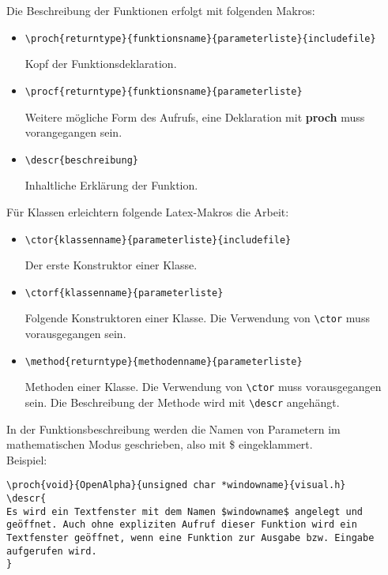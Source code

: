 \documentclass[10pt,titlepage]{article}
\newcounter{referencecounter}
\newcommand{\includefile}{INCLUDEFILE}
\newcommand{\classname}{}
\newcommand\cb[1]{\textless{}#1\textgreater}
\newcommand{\nextlabel}[3]{
  \stepcounter{referencecounter}
  \glossary{#1;#2;#3;\arabic{referencecounter}}
  \hypertarget{reflabel\arabic{referencecounter}}{}
}
\newcommand{\proc}[3]{
  \vspace*{0.5cm}
  \par\noindent#1 \hypertarget{#2}{{\bf #2}}{\small (#3)}\hspace{0.5cm} \includefile 
  \nextlabel{#1}{#2}{#3} \\
}
\newcommand{\proch}[4]{
    \renewcommand{\includefile}{\hspace*{\fill} ({\it \#include~\cb{#4}})}
  \vspace*{0.5cm}
  \par\noindent#1 \hypertarget{#2}{{\bf #2}}{\small (#3)} \includefile 
  \nextlabel{#1}{#2}{#3} \\
}
\newcommand{\procf}[3]{
  #1 \hypertarget{#2}{{\bf #2}}{\small (#3)}
  \nextlabel{#1}{#2}{#3} \\
}
\newcommand{\ctor}[4][]{
\renewcommand{\classname}{#2}
\proch{#1}{#2::#2}{#3}{#4}
}
\newcommand{\ctorf}[2]{
\renewcommand{\classname}{#1}
\procf{}{#1::#1}{#2}
}
\newcommand{\method}[3]{
\proc{#1}{\classname::#2}{#3}
}
\newcommand{\descr}[1]{\nopagebreak
  \vspace*{-0.6cm}
  \begin{quote}
        #1
  \end{quote}
}
\begin{document}
{{Die Beschreibung der Funktionen erfolgt mit folgenden Makros:
\begin{itemize}
\item
\begin{verbatim}
\proch{returntype}{funktionsname}{parameterliste}{includefile}
\end{verbatim}
Kopf der Funktionsdeklaration.
\item
\begin{verbatim}
\procf{returntype}{funktionsname}{parameterliste}
\end{verbatim}
Weitere mögliche Form des Aufrufs, eine Deklaration mit {\bf proch} muss
vorangegangen sein.
\item
\begin{verbatim}
\descr{beschreibung}
\end{verbatim}
Inhaltliche Erklärung der Funktion.
\end{itemize}

Für Klassen erleichtern folgende Latex-Makros die Arbeit:
\begin{itemize}
\item
\begin{verbatim}
\ctor{klassenname}{parameterliste}{includefile}
\end{verbatim}
Der erste Konstruktor einer Klasse.
\item
\begin{verbatim}
\ctorf{klassenname}{parameterliste}
\end{verbatim}
Folgende Konstruktoren einer Klasse. Die Verwendung von \verb+\ctor+ muss
vorausgegangen sein.
\item
\begin{verbatim}
\method{returntype}{methodenname}{parameterliste}
\end{verbatim}
Methoden einer Klasse. Die Verwendung von \verb+\ctor+ muss vorausgegangen 
sein. Die Beschreibung der Methode wird mit \verb+\descr+ angehängt.
\end{itemize}

In der Funktionsbeschreibung werden die Namen von Parametern im 
mathematischen Modus geschrieben, also mit \$ eingeklammert.\\

Beispiel:
\begin{verbatim}
\proch{void}{OpenAlpha}{unsigned char *windowname}{visual.h}
\descr{
Es wird ein Textfenster mit dem Namen $windowname$ angelegt und 
geöffnet. Auch ohne expliziten Aufruf dieser Funktion wird ein 
Textfenster geöffnet, wenn eine Funktion zur Ausgabe bzw. Eingabe 
aufgerufen wird.
}
\end{verbatim}

}}
\end{document}
